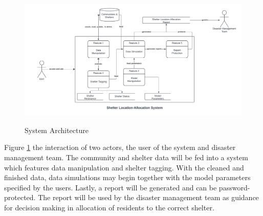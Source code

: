 \documentclass[12pt,a4paper,]{article}
\begin{document}
	\begin{figure}[h!]
		\caption{System Architecture}
		\centering
		\includegraphics[width=\columnwidth]{Context Diagram}
		\label{SystemArch}
	\end{figure}
	Figure \ref{SystemArch} the interaction of two actors, the user of the system and disaster management team. The community and shelter data will be fed into a system which features data manipulation and shelter tagging. With the cleaned and finished data, data simulations may begin together with the model parameters specified by the users. Lastly, a report will be generated and can be password-protected. The report will be used by the disaster management team as guidance for decision making in allocation of residents to the correct shelter.
	
\end{document}
